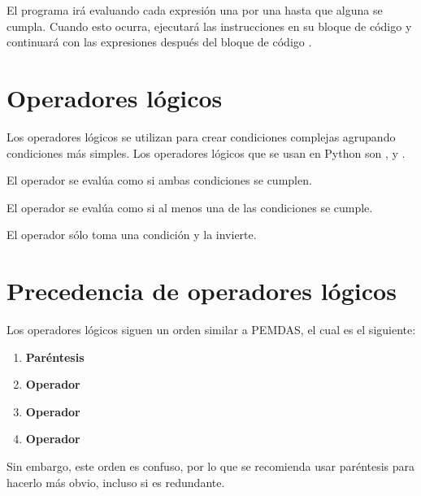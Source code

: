 El programa irá evaluando cada expresión una por una hasta que alguna se cumpla.
Cuando esto ocurra, ejecutará las instrucciones en su bloque de código y continuará con las expresiones después del bloque de código .

\section{Operadores lógicos}

Los operadores lógicos se utilizan para crear condiciones complejas agrupando condiciones más simples.
Los operadores lógicos que se usan en Python son ,  y .
\medskip

El operador  se evalúa como  si ambas condiciones se cumplen.


El operador  se evalúa como  si al menos una de las condiciones se cumple.


El operador  sólo toma una condición y la invierte.


\section{Precedencia de operadores lógicos}

Los operadores lógicos siguen un orden similar a PEMDAS, el cual es el siguiente:

\begin{enumerate}
  \item \textbf{Paréntesis} \ttt{()}
  
  \item \textbf{Operador } 
  
  \item \textbf{Operador } 
  
  \item \textbf{Operador } 
  
\end{enumerate}

Sin embargo, este orden es confuso, por lo que se recomienda usar paréntesis para hacerlo más obvio, incluso si es redundante.


\clearpage